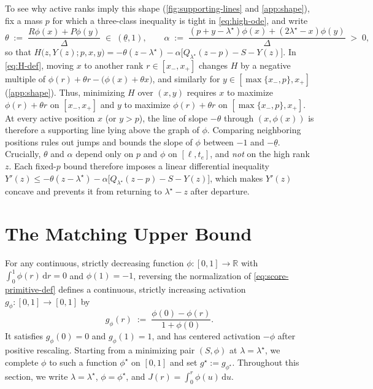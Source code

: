\documentclass[11pt]{article}
\numberwithin{equation}{section}
\theoremstyle{plain}
\theoremstyle{definition}
\newcommand{\R}{\mathbb{R}}
\newcommand{\1}{\mathbf{1}}
\begin{document}
To see why active ranks imply this shape (\cref{fig:supporting-lines} and \cref{app:shape}), fix a mass $p$ for which a three-class inequality is tight in \cref{eq:high-ode}, and write
\[
  \theta \;:=\; \frac{R\phi(x) + P\phi(y)}{\Delta} \;\in\; (\underline{\theta}, 1),
  \qquad
  \alpha \;:=\; \frac{(p + y - \lambda^\star)\phi(x) + (2\lambda^\star - x)\phi(y)}{\Delta} \;>\; 0,
\]
so that $H\bigl(z, Y(z); p, x, y\bigr) = -\theta(z - \lambda^\star) - \alpha\bigl[Q_{\lambda^\star}(z - p) - S - Y(z)\bigr]$. In \cref{eq:H-def}, moving $x$ to another rank $r \in [x_-, x_+]$ changes $H$ by a negative multiple of $\phi(r) + \theta r - \bigl(\phi(x) + \theta x\bigr)$, and similarly for $y \in [\max\{x_-, p\}, x_+]$ (\cref{app:shape}). Thus, minimizing $H$ over $(x, y)$ requires $x$ to maximize $\phi(r) + \theta r$ on $[x_-, x_+]$ and $y$ to maximize $\phi(r) + \theta r$ on $[\max\{x_-, p\}, x_+]$. At every active position $x$ (or $y > p$), the line of slope $-\theta$ through $(x, \phi(x))$ is therefore a supporting line lying above the graph of $\phi$. Comparing neighboring positions rules out jumps and bounds the slope of $\phi$ between $-1$ and $-\underline{\theta}$. Crucially, $\theta$ and $\alpha$ depend only on $p$ and $\phi$ on $[\ell, t_e]$, and \emph{not} on the high rank $z$. Each fixed-$p$ bound therefore imposes a linear differential inequality $Y'(z) \le -\theta(z - \lambda^\star) - \alpha\bigl[Q_{\lambda^\star}(z - p) - S - Y(z)\bigr]$, which makes $Y'(z)$ concave and prevents it from returning to $\lambda^\star - z$ after departure.

\section{The Matching Upper Bound}
\label{sec:upper-bound}

For any continuous, strictly decreasing function $\phi \colon [0, 1] \to \R$ with $\int_0^1 \phi(r)\,\mathrm{d}r = 0$ and $\phi(1) = -1$, reversing the normalization of \cref{eq:score-primitive-def} defines a continuous, strictly increasing activation $g_\phi \colon [0, 1] \to [0, 1]$ by
\[
  g_\phi(r) \;:=\; \frac{\phi(0) - \phi(r)}{1 + \phi(0)}.
\]
It satisfies $g_\phi(0) = 0$ and $g_\phi(1) = 1$, and has centered activation $-\phi$ after positive rescaling. Starting from a minimizing pair $(S, \phi)$ at $\lambda = \lambda^\star$, we complete $\phi$ to such a function $\phi^\star$ on $[0, 1]$ and set $g^\star := g_{\phi^\star}$. Throughout this section, we write $\lambda = \lambda^\star$, $\phi = \phi^\star$, and $J(r) = \int_0^r \phi(u)\,\mathrm{d}u$.
\end{document}
